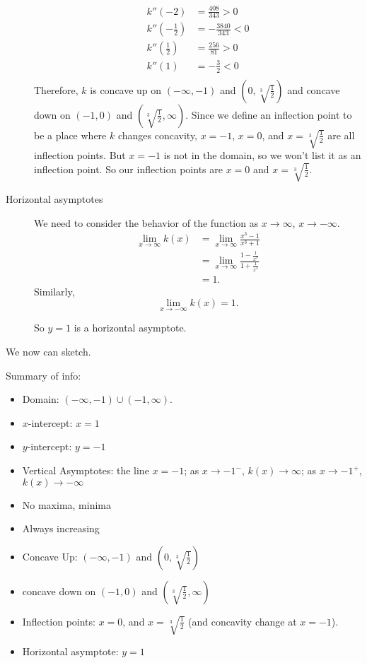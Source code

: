 \documentclass[10pt]{amsart}
\theoremstyle{definition}
\theoremstyle{remark}
\begin{document}
\begin{description}
\begin{align*}
k''(-2) &= \frac{408}{343} >0 \\
k''(-\frac{1}{2})&= -\frac{3840}{343} <0 \\
k''(\frac{1}{2})&=\frac{256}{81} >0\\
k''(1) &=  -\frac{3}{2} < 0\\
\end{align*}  
%  
  Therefore, $k$ is concave up on $(-\infty, -1)$ and $(0, \sqrt[3]{\frac{1}{2}})$ and concave down on $(-1, 0)$ and $(\sqrt[3]{\frac{1}{2}}, \infty)$. Since we define an inflection point to be a place where $k$ changes concavity, $x = -1$, $x = 0$, and $x = \sqrt[3]{\frac{1}{2}}$ are all inflection points. But $x = -1$ is not in the domain, so we won't list it as an inflection point. So our inflection points are $x= 0$ and $x = \sqrt[3]{\frac{1}{2}}$.
  
  \item[Horizontal asymptotes]
  
  We need to consider the behavior of the function as $x \to \infty$, $x \to -\infty$.
  \begin{align*}
  \lim\limits_{x\to \infty} k(x) &=  \lim\limits_{x\to \infty}  \frac{x^{3} - 1}{x^{3}+1}\\
  &= \lim\limits_{x\to \infty }\frac{1 - \frac{1}{x^{3}}}{1+\frac{1}{x^{3}}} \\
  &= 1.
  \end{align*}
  Similarly, $$\lim\limits_{x\to -\infty} k(x) = 1.$$
  
  So $y = 1$ is a horizontal asymptote.
  
  \end{description}
  
  
   We now can sketch. 
    
  Summary of info:
  \begin{itemize}
  \item Domain: $(-\infty, -1) \cup (-1, \infty)$.
  \item $x$-intercept: $x = 1$
  \item $y$-intercept: $y = -1$
\item Vertical Asymptotes: the line $x = -1$; as $x \to -1^{-}$, $k(x)\to \infty$; as $x \to -1^{+}$, $k(x) \to -\infty$ 
\item No maxima, minima
\item Always increasing
\item Concave Up: $(-\infty, -1)$ and $(0, \sqrt[3]{\frac{1}{2}})$
\item concave down on $(-1, 0)$ and $(\sqrt[3]{\frac{1}{2}}, \infty)$
\item Inflection points: $x = 0$, and $x = \sqrt[3]{\frac{1}{2}}$ (and concavity change at $x = -1$).
\item Horizontal asymptote: $y = 1$
\end{itemize}
\end{document}
